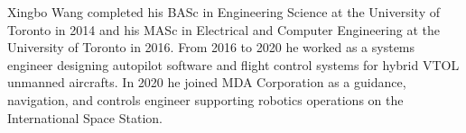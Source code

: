 Xingbo Wang completed his BASc in Engineering Science at the University of Toronto in 2014 and his MASc in Electrical and Computer Engineering at the University of Toronto in 2016. From 2016 to 2020 he worked as a systems engineer designing autopilot software and flight control systems for hybrid VTOL unmanned aircrafts. In 2020 he joined MDA Corporation as a guidance, navigation, and controls engineer supporting robotics operations on the International Space Station.

